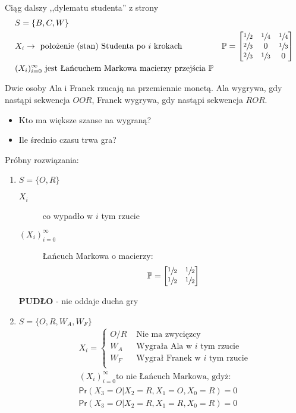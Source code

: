 \begin{example*} 
Ciąg dalszy ,,dylematu studenta'' z strony \pageref{exa:student}
\begin{align*}
&S=\{B,C,W\}\\
&X_i \rightarrow \text{ położenie (stan) Studenta po }i\text{ krokach}
&\mathbb{P}=\begin{bmatrix}
\sfrac{1}{2} & \sfrac{1}{4} & \sfrac{1}{4} \\
\sfrac{2}{3} & 0 & \sfrac{1}{3}\\
\sfrac{2}{3} & \sfrac{1}{3} &0 
\end{bmatrix}\\
&(X_i)_{i=0}^\infty \text{ jest Łańcuchem Markowa macierzy przejścia }\mathbb{P}
\end{align*}
\end{example*}
\begin{example*} 
Dwie osoby Ala i Franek rzucają na przemiennie monetą. Ala wygrywa, gdy nastąpi sekwencja $OOR$, Franek wygrywa, gdy nastąpi sekwencja $ROR$. 
\begin{itemize}
\item[] Kto ma większe szanse na wygraną? 
\item[] Ile średnio czasu trwa gra?
\end{itemize}
Próbny rozwiązania:
\begin{enumerate}[label=Próba \Roman*.]
\item $S=\{O,R\}$
\begin{description}
\item[$X_i$] co wypadło w $i$ tym rzucie
\item[$(X_i)_{i=0}^\infty$] Łańcuch Markowa o macierzy:
$$\mathbb{P}=\begin{bmatrix}
\sfrac{1}{2}&\sfrac{1}{2}\\\sfrac{1}{2}&\sfrac{1}{2}
\end{bmatrix}$$
\end{description}
\textbf{PUDŁO} - nie oddaje ducha gry

\item $S=\{O,R,W_A,W_F\}$
\begin{align*}
&X_i=\left\{\begin{matrix}
O/R & \text{ Nie ma zwycięzcy }\\
W_A & \text{ Wygrała Ala w }i\text{ tym rzucie} \\
W_F & \text{ Wygrał Franek w }i\text{ tym rzucie} \\
\end{matrix}
\right.\\
&(X_i)_{i=0}^\infty \text{to nie Łańcuch Markowa, gdyż: }\\
&\mathsf{Pr}(X_3=O|X_2=R,X_1=O,X_0=R)=0\\
&\mathsf{Pr}(X_3=O|X_2=R,X_1=R,X_0=R)=0
\end{align*}


\end{enumerate}
\end{example*}
